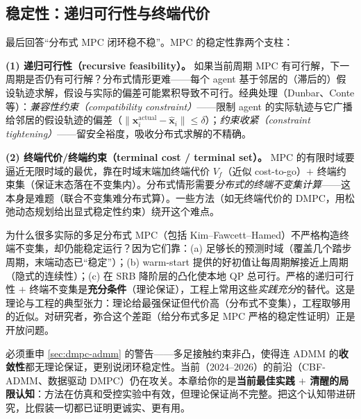\subsection{稳定性：递归可行性与终端代价}
\label{sec:dmpc-stability}

最后回答“分布式 MPC 闭环稳不稳”。MPC 的稳定性靠两个支柱：

\textbf{(1) 递归可行性（recursive feasibility）。} 如果当前周期 MPC 有可行解，下一周期是否仍有可行解？分布式情形更难——每个 agent 基于邻居的（滞后的）假设轨迹求解，假设与实际的偏差可能累积导致不可行。经典处理（Dunbar\cite{dunbar2006distributed}、Conte\cite{conte2016distributed} 等）：\emph{兼容性约束（compatibility constraint）}——限制 agent 的实际轨迹与它广播给邻居的假设轨迹的偏差（$\|\mathbf{x}_i^{\text{actual}}-\hat{\mathbf{x}}_i\|\le\delta$）；\emph{约束收紧（constraint tightening）}——留安全裕度，吸收分布式求解的不精确。

\textbf{(2) 终端代价/终端约束（terminal cost / terminal set）。} MPC 的有限时域要逼近无限时域的最优，靠在时域末端加终端代价 $V_f$（近似 cost-to-go）$+$ 终端约束集（保证末态落在不变集内）。分布式情形需要\emph{分布式的终端不变集计算}——这本身是难题（联合不变集难分布式算）。一些方法（如无终端代价的 DMPC，用松弛动态规划给出显式稳定性约束）绕开这个难点。

\begin{insight}\label{ins:dmpc-practical-stability}
为什么很多实际的多足分布式 MPC（包括 Kim--Fawcett--Hamed\cite{kim2023layered}）不严格构造终端不变集，却仍能稳定运行？因为它们靠：(a) 足够长的预测时域（覆盖几个踏步周期，末端动态已“稳定”）；(b) warm-start 提供的好初值让每周期解接近上周期（隐式的连续性）；(c) 在 SRB 降阶层的凸化使本地 QP 总可行。严格的递归可行性 $+$ 终端不变集是\textbf{充分条件}（理论保证），工程上常用这些\emph{实践充分}的替代。这是理论与工程的典型张力：理论给最强保证但代价高（分布式不变集），工程取够用的近似。对研究者，弥合这个差距（给分布式多足 MPC 严格的稳定性证明）正是开放问题。
\end{insight}

\begin{insight}\label{ins:dmpc-nonconvex-honest}
必须重申 \cref{sec:dmpc-admm} 的警告——多足接触约束非凸，使得连 ADMM 的\textbf{收敛性}都无理论保证，更别说闭环稳定性。当前（$2024$–$2026$）的前沿（CBF-ADMM\cite{zeng2026admmcbf}、数据驱动 DMPC\cite{fawcett2024datadriven}）仍在攻关。本章给你的是\textbf{当前最佳实践 $+$ 清醒的局限认知}：方法在仿真和受控实验中有效，但理论保证尚不完整。把这个认知带进研究，比假装一切都已证明更诚实、更有用。
\end{insight}


